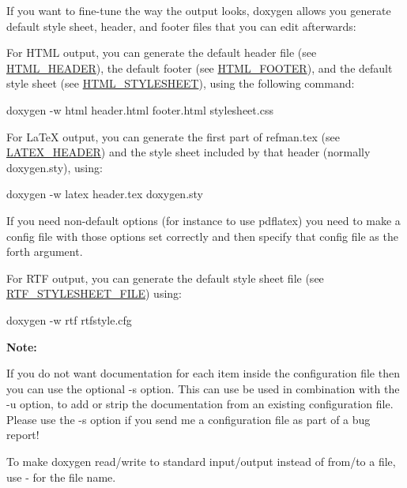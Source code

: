 \label{doxygen_usage_doxygen_finetune}
\hypertarget{doxygen_usage_doxygen_finetune}{}
 If you want to fine-\/tune the way the output looks, doxygen allows you generate default style sheet, header, and footer files that you can edit afterwards: 
\begin{DoxyItemize}
\item For HTML output, you can generate the default header file (see \hyperlink{config_cfg_html_header}{HTML\_\-HEADER}), the default footer (see \hyperlink{config_cfg_html_footer}{HTML\_\-FOOTER}), and the default style sheet (see \hyperlink{config_cfg_html_stylesheet}{HTML\_\-STYLESHEET}), using the following command: \begin{DoxyVerb}
doxygen -w html header.html footer.html stylesheet.css
\end{DoxyVerb}
 
\item For LaTeX output, you can generate the first part of {\ttfamily refman.tex} (see \hyperlink{config_cfg_latex_header}{LATEX\_\-HEADER}) and the style sheet included by that header (normally {\ttfamily doxygen.sty}), using: \begin{DoxyVerb}
doxygen -w latex header.tex doxygen.sty
\end{DoxyVerb}
 If you need non-\/default options (for instance to use pdflatex) you need to make a config file with those options set correctly and then specify that config file as the forth argument. 
\item For RTF output, you can generate the default style sheet file (see \hyperlink{config_cfg_rtf_stylesheet_file}{RTF\_\-STYLESHEET\_\-FILE}) using: \begin{DoxyVerb}
doxygen -w rtf rtfstyle.cfg
\end{DoxyVerb}
 
\end{DoxyItemize}

{\bfseries Note:}\par
 
\begin{DoxyItemize}
\item If you do not want documentation for each item inside the configuration file then you can use the optional {\ttfamily -\/s} option. This can use be used in combination with the {\ttfamily -\/u} option, to add or strip the documentation from an existing configuration file. Please use the {\ttfamily -\/s} option if you send me a configuration file as part of a bug report! 
\item To make doxygen read/write to standard input/output instead of from/to a file, use {\ttfamily -\/} for the file name. 
\end{DoxyItemize}